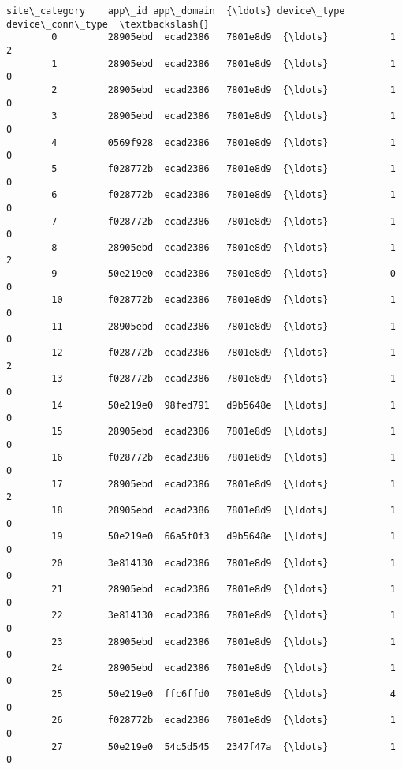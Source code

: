 \documentclass[11pt]{article}
\begin{document}
\begin{Verbatim}[commandchars=\\\{\}]
             site\_category    app\_id app\_domain  {\ldots} device\_type device\_conn\_type  \textbackslash{}
        0         28905ebd  ecad2386   7801e8d9  {\ldots}           1                2   
        1         28905ebd  ecad2386   7801e8d9  {\ldots}           1                0   
        2         28905ebd  ecad2386   7801e8d9  {\ldots}           1                0   
        3         28905ebd  ecad2386   7801e8d9  {\ldots}           1                0   
        4         0569f928  ecad2386   7801e8d9  {\ldots}           1                0   
        5         f028772b  ecad2386   7801e8d9  {\ldots}           1                0   
        6         f028772b  ecad2386   7801e8d9  {\ldots}           1                0   
        7         f028772b  ecad2386   7801e8d9  {\ldots}           1                0   
        8         28905ebd  ecad2386   7801e8d9  {\ldots}           1                2   
        9         50e219e0  ecad2386   7801e8d9  {\ldots}           0                0   
        10        f028772b  ecad2386   7801e8d9  {\ldots}           1                0   
        11        28905ebd  ecad2386   7801e8d9  {\ldots}           1                0   
        12        f028772b  ecad2386   7801e8d9  {\ldots}           1                2   
        13        f028772b  ecad2386   7801e8d9  {\ldots}           1                0   
        14        50e219e0  98fed791   d9b5648e  {\ldots}           1                0   
        15        28905ebd  ecad2386   7801e8d9  {\ldots}           1                0   
        16        f028772b  ecad2386   7801e8d9  {\ldots}           1                0   
        17        28905ebd  ecad2386   7801e8d9  {\ldots}           1                2   
        18        28905ebd  ecad2386   7801e8d9  {\ldots}           1                0   
        19        50e219e0  66a5f0f3   d9b5648e  {\ldots}           1                0   
        20        3e814130  ecad2386   7801e8d9  {\ldots}           1                0   
        21        28905ebd  ecad2386   7801e8d9  {\ldots}           1                0   
        22        3e814130  ecad2386   7801e8d9  {\ldots}           1                0   
        23        28905ebd  ecad2386   7801e8d9  {\ldots}           1                0   
        24        28905ebd  ecad2386   7801e8d9  {\ldots}           1                0   
        25        50e219e0  ffc6ffd0   7801e8d9  {\ldots}           4                0   
        26        f028772b  ecad2386   7801e8d9  {\ldots}           1                0   
        27        50e219e0  54c5d545   2347f47a  {\ldots}           1                0   

\end{Verbatim}
\end{document}
